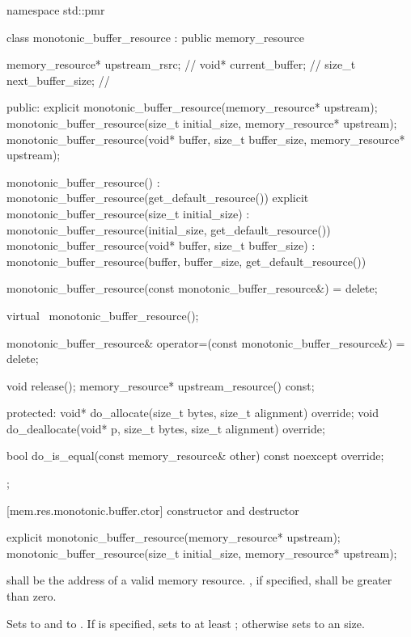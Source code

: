 %
\begin{codeblock}
namespace std::pmr {
  class monotonic_buffer_resource : public memory_resource {
    memory_resource* upstream_rsrc;     // \expos
    void* current_buffer;               // \expos
    size_t next_buffer_size;            // \expos

  public:
    explicit monotonic_buffer_resource(memory_resource* upstream);
    monotonic_buffer_resource(size_t initial_size, memory_resource* upstream);
    monotonic_buffer_resource(void* buffer, size_t buffer_size, memory_resource* upstream);

    monotonic_buffer_resource()
        : monotonic_buffer_resource(get_default_resource()) {}
    explicit monotonic_buffer_resource(size_t initial_size)
        : monotonic_buffer_resource(initial_size, get_default_resource()) {}
    monotonic_buffer_resource(void* buffer, size_t buffer_size)
        : monotonic_buffer_resource(buffer, buffer_size, get_default_resource()) {}

    monotonic_buffer_resource(const monotonic_buffer_resource&) = delete;

    virtual ~monotonic_buffer_resource();

    monotonic_buffer_resource& operator=(const monotonic_buffer_resource&) = delete;

    void release();
    memory_resource* upstream_resource() const;

  protected:
    void* do_allocate(size_t bytes, size_t alignment) override;
    void do_deallocate(void* p, size_t bytes, size_t alignment) override;

    bool do_is_equal(const memory_resource& other) const noexcept override;
  };
}
\end{codeblock}

[mem.res.monotonic.buffer.ctor]{ constructor and destructor}

%
\begin{itemdecl}
explicit monotonic_buffer_resource(memory_resource* upstream);
monotonic_buffer_resource(size_t initial_size, memory_resource* upstream);
\end{itemdecl}

\begin{itemdescr}
\pnum
\requires
{} shall be the address of a valid memory resource.
, if specified, shall be greater than zero.

\pnum
\effects
Sets  to  and
 to .
If  is specified,
sets  to at least ;
otherwise sets  to an
 size.
\end{itemdescr}

